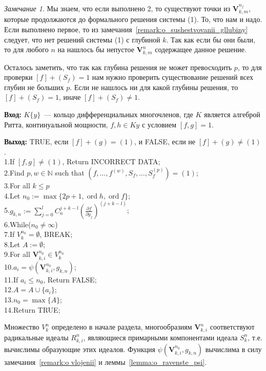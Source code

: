 \documentclass[16pt]{article}
\DeclareMathOperator{\ord}{ord}
\theoremstyle{plain1}
\theoremstyle{plain2}
\theoremstyle{plain}
\theoremstyle{plain3}
\theoremstyle{definition}
\theoremstyle{remark}
\newtheorem{remark}[theorem1]{Замечание}
\begin{document}
\begin{remark}
Мы знаем, что если выполнено 2, то существуют точки из $\mathbf{V}_{k,m}^{n_j}$, которые продолжаются до формального решения системы (1). То, что нам и надо. Если выполнено первое, то из замечания~\ref{remark:o_sushestvovanii_gllubiny} следует, что нет решений системы (1)  с глубиной $k$. Так как если бы они были, то для любого $n$ на нашлось бы непустое $\mathbf{V}_{k,m}^{n}$ содержащее данное решение.

Осталось заметить, что так как глубина решения не может превосходить $p$, то для проверки $[f]+(S_f)=1$ нам нужно проверить существование решений всех глубин не больших $p$. Если не нашлось ни для какой глубины решения, то $[f]+(S_f)=1$, иначе $[f]+(S_f)\neq1$.
\end{remark}

{\bf Вход:} $K\{y\}$~--- кольцо дифференциальных многочленов, где $K$ является алгеброй Ритта, континуальной мощности, $f,h\in K{y}$ с условием $[f,g]=1$.

{\bf Выход:} TRUE, если  $[f]+(g)=(1)$, и FALSE, если не $[f]+(g)\not=(1)$.
\\
1.\qquad If $[f,g]\not=(1)$, Return  INCORRECT DATA;\\
2.\qquad Find $p,w\in \mathbb{N}$ such that $(f,\ldots,f^{(w)},S_f,\ldots,S_f^{(p)})=(1)$;\\
3.\qquad For all $k\leqslant p$\\
4.\qquad\qquad Let $n_0:=\max\{ 2p+1,\ord{h},\ord{f}\}$;\\
5.\qquad\qquad $g_{k,n}:=\sum\limits_{j=0}^{l}C_n^{j+k - l }\left(\frac{\partial f}{\partial y_j}\right)^{(j+k - l)}$;\\
6.\qquad\qquad While($n_0\not=\infty$)\\
7.\qquad\qquad\qquad If $V_k^{n_0}=\emptyset$, BREAK;\\
8.\qquad\qquad\qquad Let $A:=\emptyset$;\\
9.\qquad\qquad\qquad For all $\mathbf{V}_{k,i}^{n_0}\in V_k^{n_0}$\\
10.\qquad\qquad\qquad\qquad $a_i=\psi(\mathbf{V}_{k,i}^{n_0},g_{k,n})$;\\
11.\qquad\qquad\qquad\qquad If $a_i\leqslant n_0$, Return FALSE;\\
12.\qquad\qquad\qquad\qquad $A=A\cup\{a_i\}$;\\
13.\qquad\qquad\qquad $n_0=\max\{A\}$;\\
14.\qquad Return TRUE;

Множество $V_k^{n}$ определено в начале раздела, многообразиям $\mathbf{V}_{k,i}^{n}$ соответствуют радикальные идеалы $R_{k,i}^{n}$, являющиеся примарными компонентами идеала $S_k^n$, т.е. вычислимы образующие этих идеалов. 
Функция $\psi(\mathbf{V}_{k,i}^{n_0},g_{k,n})$ вычислима в силу замечания~\ref{remark:o vlojenii} и леммы~\ref{lemma:o_ravenste_psi}.
\end{document}
